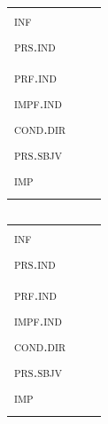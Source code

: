 \begin{table}
	\caption{}
	\label{}
	\begin{tabular}{lll}
		\lsptoprule
		\\
		\midrule
		\textsc{inf} & \\
		\textsc{prs.ind} & \\
		& \\
		\textsc{prf.ind} & \\
		\textsc{impf.ind} & \\
		\textsc{cond.dir} & \\
		\textsc{prs.sbjv}	&\\
		\textsc{imp}	& \\
		\lspbottomrule
	\end{tabular}
\end{table}
\textsc{}

\begin{table}
	\caption{}
	\label{}
	\begin{tabular}{lll}
		\lsptoprule
		\\
		\midrule
		\textsc{inf} & \\
		\textsc{prs.ind} & \\
		& \\
		\textsc{prf.ind} & \\
		\textsc{impf.ind} & \\
		\textsc{cond.dir} & \\
		\textsc{prs.sbjv}	&\\
		\textsc{imp}	& \\
		\lspbottomrule
	\end{tabular}
\end{table}




